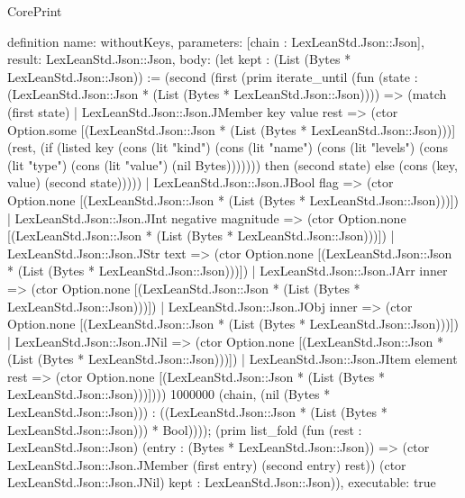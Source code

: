 \begin{lexlean}{CorePrint}
\begin{semanticmodule}
definition{
  name: withoutKeys,
  parameters: [chain : LexLeanStd.Json::Json],
  result: LexLeanStd.Json::Json,
  body: (let kept : (List (Bytes * LexLeanStd.Json::Json)) := (second (first (prim iterate_until (fun (state : (LexLeanStd.Json::Json * (List (Bytes * LexLeanStd.Json::Json)))) => (match (first state)
    | LexLeanStd.Json::Json.JMember key value rest => (ctor Option.some [(LexLeanStd.Json::Json * (List (Bytes * LexLeanStd.Json::Json)))] (rest, (if (listed key (cons (lit "kind") (cons (lit "name") (cons (lit "levels") (cons (lit "type") (cons (lit "value") (nil Bytes))))))) then (second state) else (cons (key, value) (second state)))))
    | LexLeanStd.Json::Json.JBool flag => (ctor Option.none [(LexLeanStd.Json::Json * (List (Bytes * LexLeanStd.Json::Json)))])
    | LexLeanStd.Json::Json.JInt negative magnitude => (ctor Option.none [(LexLeanStd.Json::Json * (List (Bytes * LexLeanStd.Json::Json)))])
    | LexLeanStd.Json::Json.JStr text => (ctor Option.none [(LexLeanStd.Json::Json * (List (Bytes * LexLeanStd.Json::Json)))])
    | LexLeanStd.Json::Json.JArr inner => (ctor Option.none [(LexLeanStd.Json::Json * (List (Bytes * LexLeanStd.Json::Json)))])
    | LexLeanStd.Json::Json.JObj inner => (ctor Option.none [(LexLeanStd.Json::Json * (List (Bytes * LexLeanStd.Json::Json)))])
    | LexLeanStd.Json::Json.JNil => (ctor Option.none [(LexLeanStd.Json::Json * (List (Bytes * LexLeanStd.Json::Json)))])
    | LexLeanStd.Json::Json.JItem element rest => (ctor Option.none [(LexLeanStd.Json::Json * (List (Bytes * LexLeanStd.Json::Json)))]))) 1000000 (chain, (nil (Bytes * LexLeanStd.Json::Json))) : ((LexLeanStd.Json::Json * (List (Bytes * LexLeanStd.Json::Json))) * Bool)))); (prim list_fold (fun (rest : LexLeanStd.Json::Json) (entry : (Bytes * LexLeanStd.Json::Json)) => (ctor LexLeanStd.Json::Json.JMember (first entry) (second entry) rest)) (ctor LexLeanStd.Json::Json.JNil) kept : LexLeanStd.Json::Json)),
  executable: true
}


\end{semanticmodule}
\end{lexlean}

